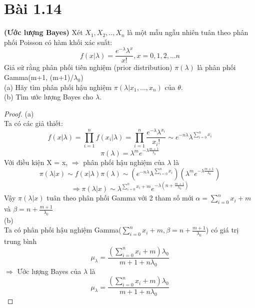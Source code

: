 \section*{Bài 1.14}
%

\begin{problem}{1.14}
\textbf{(Ước lượng Bayes)} Xét $X_1, X_2,.., X_n$ là một mẫu ngẫu nhiên  tuân theo phân phối Poisson có hàm khối xác suất:
\begin{equation}
f(x|\lambda)=\frac{e^{-\lambda}\lambda^x}{x!} , x=0, 1, 2,... n
\end{equation}
Giả sử rằng phân phối tiên nghiệm (prior distribution) $\pi(\lambda)$ là phân phối Gamma(m+1, (m+1)/$\lambda_0$)\\
(a) Hãy tìm phân phối hậu nghiệm $\pi(\lambda|x_1,...,x_n)$ của $\theta$.\\
(b) Tìm ước lượng Bayes cho $\lambda$.
\end{problem}

\begin{proof}
(a)\\
Ta có các giả thiết:
\begin{equation}
f(x|\lambda)=\prod_{i=1}^nf(x_i|\lambda)=\prod_{i=1}^n\frac{e^{-\lambda}\lambda^{x_i}}{x_i!} \sim e^{-n\lambda}\lambda^{\sum_{i=0}^n{x_i}}
\end{equation}
\begin{equation}
\pi(\lambda) = \lambda^me^{-\lambda\frac{m+1}{\lambda_0}}
\end{equation}
Với điều kiện X = x, $\Rightarrow$ phân phối hậu nghiệm của $\lambda$ là
\begin{equation}
\pi(\lambda|x)\sim f(x|\lambda)\pi(\lambda)\sim (e^{-n\lambda}\lambda^{\sum_{i=0}^n{x_i}})(\lambda^me^{-\lambda\frac{m+1}{\lambda_0}})
\end{equation}
\begin{equation}
\Rightarrow\pi(\lambda|x)\sim \lambda^{\sum_{i=0}^n{x_i}+m}e^{-\lambda(n+\frac{m+1}{\lambda_0})}
\end{equation}
Vậy $\pi(\lambda|x)$ tuân theo phân phối Gamma với 2 tham số mới $\alpha = \sum_{i=0}^n{x_i}+m$  và $\beta=n+\frac{m+1}{\lambda_0}$\\
(b) \\
Ta có phân phối hậu nghiệm Gamma($\sum_{i=0}^n{x_i}+m, \beta=n+\frac{m+1}{\lambda_0}$) có giá trị trung bình
\begin{equation}
\mu_\lambda=\frac{(\sum_{i=0}^n{x_i}+m)\lambda_0}{m+1+n\lambda_0}
\end{equation}
$\Rightarrow $ Ước lượng Bayes của $\lambda$ là
\begin{equation}
\mu_\lambda=\frac{(\sum_{i=0}^n{x_i}+m)\lambda_0}{m+1+n\lambda_0}
\end{equation}
\end{proof}
